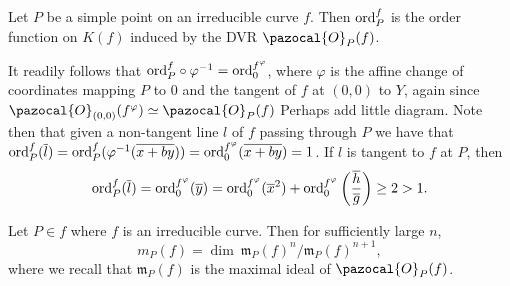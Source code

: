     \begin{definition}
        Let $P$ be a simple point on an irreducible curve $f$. Then $\mathrm{ord}_P^f$ is the order function on $K(f)$ induced by the DVR $\pazocal{O}_P(f)$.
    \end{definition}
    \begin{remark}
        It readily follows that $\mathrm{ord}_P^f\circ \varphi^{-1} = \mathrm{ord}_0^{f^\varphi}$, where $\varphi$ is the affine change of coordinates mapping $P$ to $0$ and the tangent of $f$ at $(0,0)$ to $Y$, again since $\pazocal{O}_{(0,0)}(f^{\varphi})\simeq \pazocal{O}_P(f)$ {\Large Perhaps add little diagram}. Note then that given a non-tangent line $l$ of $f$ passing through $P$ we have that $\mathrm{ord}_P^f(\overline{l})=\mathrm{ord}_P^f(\varphi^{-1}(\overline{x+by}))=\mathrm{ord}_0^{f^\varphi}(\overline{x+by})=1$. If $l$ is tangent to $f$ at $P$, then 
        $$\mathrm{ord}_P^f(\overline{l})=\mathrm{ord}_0^{f^\varphi}(\overline{y})=\mathrm{ord}_0^{f^\varphi}(\overline{x}^2)+\mathrm{ord}_0^{f^\varphi}\left(\frac{\overline{h}}{\overline{g}}\right)\geq 2>1.$$
    \end{remark}
    \begin{theorem}\label{LocalRingDimensionMultiplicityCorrespondence}
        Let $P\in f$ where $f$ is an irreducible curve. Then for sufficiently large $n$,
        $$m_P(f) = \dim \ \mathfrak{m}_P(f)^n/\mathfrak{m}_P(f)^{n+1},$$
        where we recall that $\mathfrak{m}_P(f)$ is the maximal ideal of $\pazocal{O}_P(f)$.
    \end{theorem}
